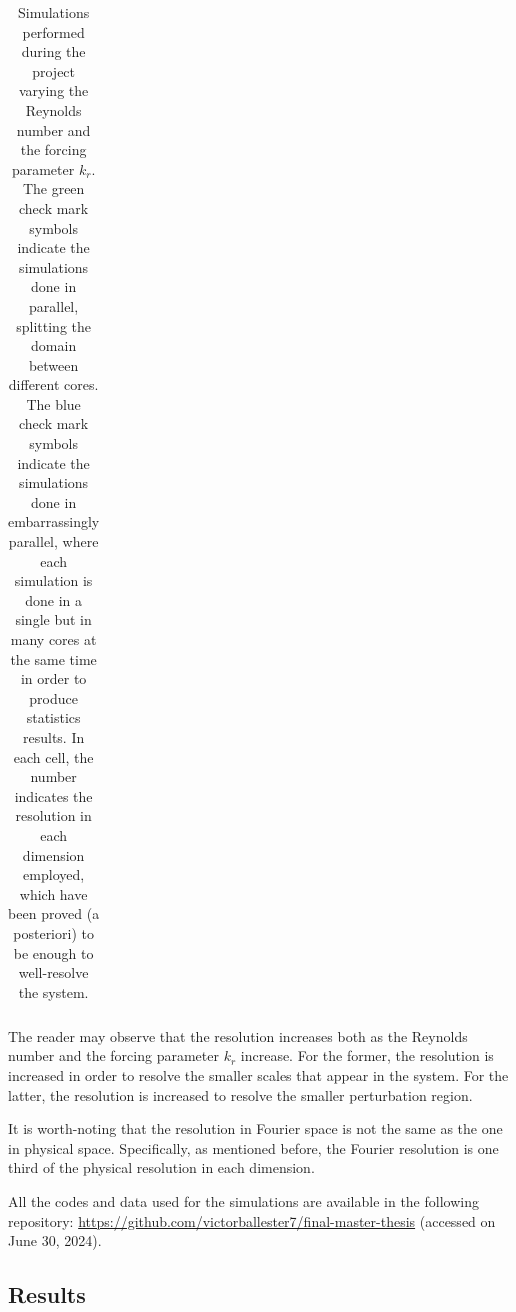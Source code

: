 \documentclass[../main.tex]{subfiles}
\begin{document}
\begin{table}[ht]
\begin{tabular}{c|cccccccccc}
	\end{tabular}
	\caption{Simulations performed during the project varying the Reynolds number and the forcing parameter $k_r$. The green check mark symbols indicate the simulations done in parallel, splitting the domain between different cores. The blue check mark symbols indicate the simulations done in embarrassingly parallel, where each simulation is done in a single but in many cores at the same time in order to produce statistics results. In each cell, the number indicates the resolution in each dimension employed, which have been proved (a posteriori) to be enough to well-resolve the system.}\label{tab:simulations}
\end{table}

The reader may observe that the resolution increases both as the Reynolds number and the forcing parameter $k_r$ increase. For the former, the resolution is increased in order to resolve the smaller scales that appear in the system. For the latter, the resolution is increased to resolve the smaller perturbation region.

It is worth-noting that the resolution in Fourier space is not the same as the one in physical space. Specifically, as mentioned before, the Fourier resolution is one third of the physical resolution in each dimension.

All the codes and data used for the simulations are available in the following repository: \url{https://github.com/victorballester7/final-master-thesis} (accessed on June 30, 2024).

\subsection{Results}\label{sec:results}
\end{document}
